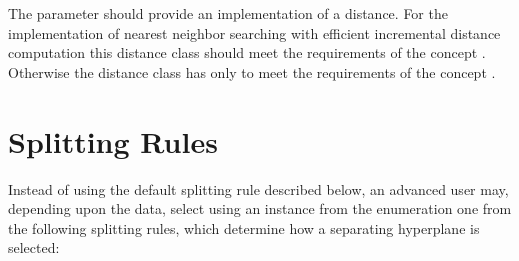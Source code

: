 The parameter  should provide an implementation of a distance.
For the implementation of nearest neighbor searching with efficient incremental
distance computation this distance class should meet the requirements of the concept
. Otherwise the distance class has only to meet the
requirements of the concept .


\section{Splitting Rules}

Instead of using the default splitting rule  described below,
an advanced user may, depending upon the data, select 
using an instance from the enumeration 
one from the following splitting rules,
which determine how a separating hyperplane is selected:

